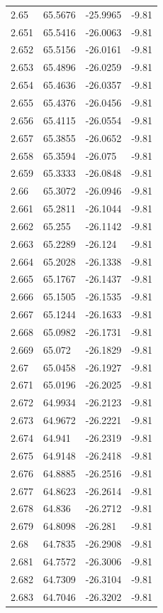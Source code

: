 \begin{tabular}{llll}
2.65 & 65.5676 & -25.9965 & -9.81 \\
2.651 & 65.5416 & -26.0063 & -9.81 \\
2.652 & 65.5156 & -26.0161 & -9.81 \\
2.653 & 65.4896 & -26.0259 & -9.81 \\
2.654 & 65.4636 & -26.0357 & -9.81 \\
2.655 & 65.4376 & -26.0456 & -9.81 \\
2.656 & 65.4115 & -26.0554 & -9.81 \\
2.657 & 65.3855 & -26.0652 & -9.81 \\
2.658 & 65.3594 & -26.075 & -9.81 \\
2.659 & 65.3333 & -26.0848 & -9.81 \\
2.66 & 65.3072 & -26.0946 & -9.81 \\
2.661 & 65.2811 & -26.1044 & -9.81 \\
2.662 & 65.255 & -26.1142 & -9.81 \\
2.663 & 65.2289 & -26.124 & -9.81 \\
2.664 & 65.2028 & -26.1338 & -9.81 \\
2.665 & 65.1767 & -26.1437 & -9.81 \\
2.666 & 65.1505 & -26.1535 & -9.81 \\
2.667 & 65.1244 & -26.1633 & -9.81 \\
2.668 & 65.0982 & -26.1731 & -9.81 \\
2.669 & 65.072 & -26.1829 & -9.81 \\
2.67 & 65.0458 & -26.1927 & -9.81 \\
2.671 & 65.0196 & -26.2025 & -9.81 \\
2.672 & 64.9934 & -26.2123 & -9.81 \\
2.673 & 64.9672 & -26.2221 & -9.81 \\
2.674 & 64.941 & -26.2319 & -9.81 \\
2.675 & 64.9148 & -26.2418 & -9.81 \\
2.676 & 64.8885 & -26.2516 & -9.81 \\
2.677 & 64.8623 & -26.2614 & -9.81 \\
2.678 & 64.836 & -26.2712 & -9.81 \\
2.679 & 64.8098 & -26.281 & -9.81 \\
2.68 & 64.7835 & -26.2908 & -9.81 \\
2.681 & 64.7572 & -26.3006 & -9.81 \\
2.682 & 64.7309 & -26.3104 & -9.81 \\
2.683 & 64.7046 & -26.3202 & -9.81 \\

\end{tabular}
